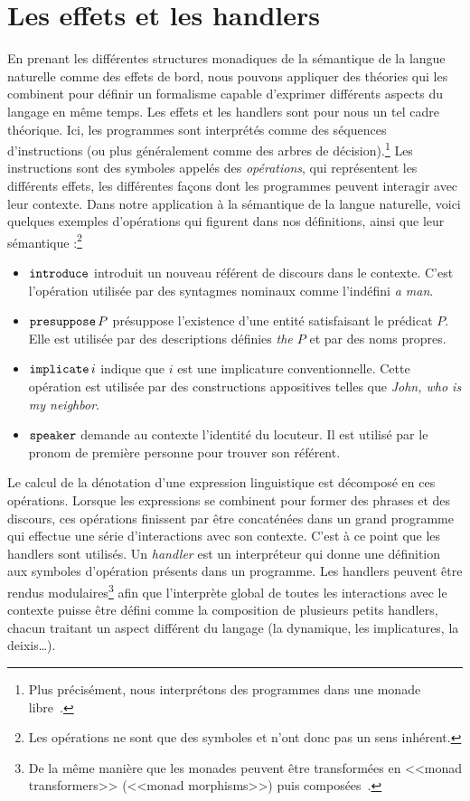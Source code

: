 \section*{Les effets et les handlers}

En prenant les différentes structures monadiques de la sémantique de la langue
naturelle comme des effets de bord, nous pouvons appliquer des théories qui les 
combinent pour définir un formalisme capable d'exprimer différents aspects du langage 
en même temps. Les effets et les handlers sont pour nous un tel
cadre théorique. Ici, les programmes sont interprétés comme des
séquences d'instructions (ou plus généralement comme des arbres de
décision).\footnote{Plus précisément, nous interprétons des programmes dans une
  monade libre~\cite{swierstra2008data}.} Les instructions sont des symboles
appelés des \emph{opérations}, qui représentent les différents effets, les
différentes façons dont les programmes peuvent interagir avec leur contexte.
Dans notre application à la sémantique de la langue naturelle, voici quelques
exemples d'opérations qui figurent dans nos définitions, ainsi que leur
sémantique :\footnote{Les opérations ne sont que des symboles et n'ont donc pas
  un sens inhérent.}

\begin{itemize}
\item $\mathtt{introduce}$ introduit un nouveau référent de discours dans le
  contexte. C'est l'opération utilisée par des syntagmes nominaux comme
  l'indéfini \emph{a man}.
\item $\mathtt{presuppose}\,P$ présuppose l'existence d'une entité satisfaisant
  le prédicat $P$. Elle est utilisée par des descriptions définies \emph{the $P$}
  et par des noms propres.
\item $\mathtt{implicate}\,i$ indique que $i$ est une implicature
  conventionnelle. Cette opération est utilisée par des constructions
  appositives telles que \emph {John, who is my neighbor}.
\item $\mathtt{speaker}$ demande au contexte l'identité du locuteur. Il est utilisé
  par le pronom de première personne pour trouver son référent.
\end{itemize}

Le calcul de la dénotation d'une expression linguistique est décomposé en ces
opérations. Lorsque les expressions se combinent pour former des phrases et des
discours, ces opérations finissent par être concaténées dans un grand programme
qui effectue une série d'interactions avec son contexte. C'est à ce point que
les handlers sont utilisés. Un \emph{handler} est un interpréteur qui donne une
définition aux symboles d'opération présents dans un programme. Les handlers peuvent être
rendus modulaires\footnote{De la même manière que les monades peuvent être
  transformées en <<monad transformers>> (<<monad morphisms>>) puis
  composées~\cite{shan2002monads,wu2015transformers}.} afin que l'interprète
global de toutes les interactions avec le contexte puisse être défini comme la
composition de plusieurs petits handlers, chacun traitant un aspect différent du
langage (la dynamique, les implicatures, la deixis\ldots).

